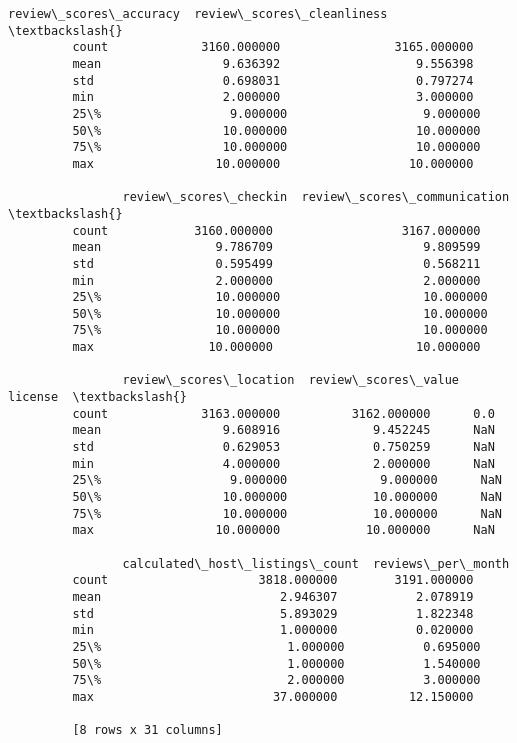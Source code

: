 \documentclass[11pt]{article}
\begin{document}
\begin{Verbatim}[commandchars=\\\{\}]
                review\_scores\_accuracy  review\_scores\_cleanliness  \textbackslash{}
         count             3160.000000                3165.000000   
         mean                 9.636392                   9.556398   
         std                  0.698031                   0.797274   
         min                  2.000000                   3.000000   
         25\%                  9.000000                   9.000000   
         50\%                 10.000000                  10.000000   
         75\%                 10.000000                  10.000000   
         max                 10.000000                  10.000000   
         
                review\_scores\_checkin  review\_scores\_communication  \textbackslash{}
         count            3160.000000                  3167.000000   
         mean                9.786709                     9.809599   
         std                 0.595499                     0.568211   
         min                 2.000000                     2.000000   
         25\%                10.000000                    10.000000   
         50\%                10.000000                    10.000000   
         75\%                10.000000                    10.000000   
         max                10.000000                    10.000000   
         
                review\_scores\_location  review\_scores\_value  license  \textbackslash{}
         count             3163.000000          3162.000000      0.0   
         mean                 9.608916             9.452245      NaN   
         std                  0.629053             0.750259      NaN   
         min                  4.000000             2.000000      NaN   
         25\%                  9.000000             9.000000      NaN   
         50\%                 10.000000            10.000000      NaN   
         75\%                 10.000000            10.000000      NaN   
         max                 10.000000            10.000000      NaN   
         
                calculated\_host\_listings\_count  reviews\_per\_month  
         count                     3818.000000        3191.000000  
         mean                         2.946307           2.078919  
         std                          5.893029           1.822348  
         min                          1.000000           0.020000  
         25\%                          1.000000           0.695000  
         50\%                          1.000000           1.540000  
         75\%                          2.000000           3.000000  
         max                         37.000000          12.150000  
         
         [8 rows x 31 columns]
\end{Verbatim}
            
\end{document}
